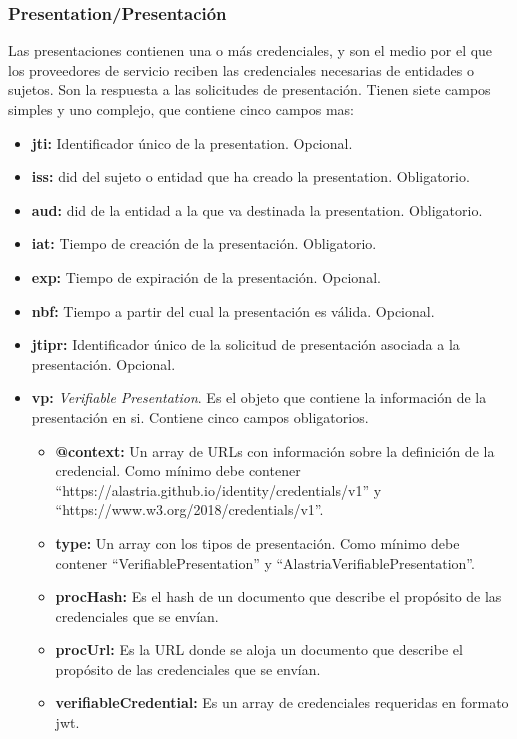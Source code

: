 \subsubsection*{Presentation/Presentación}
Las presentaciones contienen una o más credenciales, y son el medio por el que los proveedores de servicio reciben las credenciales necesarias de entidades o sujetos. Son la respuesta a las solicitudes de presentación.
Tienen siete campos simples y uno complejo, que contiene cinco campos mas:
\begin{itemize}
    \item \textbf{jti:} Identificador único de la presentation. Opcional.
    \item \textbf{iss:} \acrshort{did} del sujeto o entidad que ha creado la presentation. Obligatorio.
    \item \textbf{aud:} \acrshort{did} de la entidad a la que va destinada la presentation. Obligatorio.
    \item \textbf{iat:} Tiempo de creación de la presentación. Obligatorio.
    \item \textbf{exp:} Tiempo de expiración de la presentación. Opcional.
    \item \textbf{nbf:} Tiempo a partir del cual la presentación es válida. Opcional.
    \item \textbf{jtipr:} Identificador único de la solicitud de presentación asociada a la presentación. Opcional.
    \item \textbf{vp:} \textit{Verifiable Presentation}. Es el objeto que contiene la información de la presentación en si. Contiene cinco campos obligatorios.
    \begin{itemize}
        \item \textbf{@context:} Un array de URLs con información sobre la definición de la credencial. Como mínimo debe contener\\
        ``https://alastria.github.io/identity/credentials/v1'' y \\
        ``https://www.w3.org/2018/credentials/v1''.
        \item \textbf{type:} Un array con los tipos de presentación. Como mínimo debe contener ``VerifiablePresentation'' y ``AlastriaVerifiablePresentation''.
        \item \textbf{procHash:} Es el hash de un documento que describe el propósito de las credenciales que se envían. 
        \item \textbf{procUrl:} Es la URL donde se aloja un documento que describe el propósito de las credenciales que se envían. 
        \item \textbf{verifiableCredential:} Es un array de credenciales requeridas en formato \acrshort{jwt}.
    \end{itemize}
\end{itemize}
